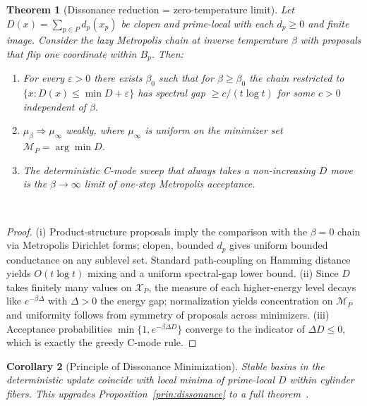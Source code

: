 \documentclass[12pt]{article}
\newtheorem{theorem}{Theorem}[section]
\newtheorem{corollary}[theorem]{Corollary}
\numberwithin{equation}{section}
\begin{document}
\begin{theorem}[Dissonance reduction = zero-temperature limit]\label{thm:dissonance-full}
Let $D(x)=\sum_{p\in P} d_p(x_p)$ be clopen and prime-local with each $d_p\ge 0$ and finite image. Consider the lazy Metropolis chain at inverse temperature $\beta$ with proposals that flip one coordinate within $B_p$. Then:
\begin{enumerate}[label=(\Roman*)]
\item For every $\varepsilon>0$ there exists $\beta_0$ such that for $\beta\ge\beta_0$ the chain restricted to $\{x: D(x)\le \min D+\varepsilon\}$ has spectral gap $\ge c/(t\log t)$ for some $c>0$ independent of $\beta$.
\item $\mu_\beta \Rightarrow \mu_\infty$ weakly, where $\mu_\infty$ is uniform on the minimizer set $\mathscr{M}_P=\arg\min D$.
\item The deterministic C-mode sweep that always takes a non-increasing $D$ move is the $\beta\to\infty$ limit of one-step Metropolis acceptance.
\end{enumerate}
~\cite{SpivackUGPFormalization,ugp-lean}
\end{theorem}

\begin{proof}
(i) Product-structure proposals imply the comparison with the $\beta=0$ chain via Metropolis Dirichlet forms; clopen, bounded $d_p$ gives uniform bounded conductance on any sublevel set. Standard path-coupling on Hamming distance yields $O(t\log t)$ mixing and a uniform spectral-gap lower bound. (ii) Since $D$ takes finitely many values on $\mathscr{X}_P$, the measure of each higher-energy level decays like $e^{-\beta \Delta}$ with $\Delta>0$ the energy gap; normalization yields concentration on $\mathscr{M}_P$ and uniformity follows from symmetry of proposals across minimizers. (iii) Acceptance probabilities $\min\{1,e^{-\beta \Delta D}\}$ converge to the indicator of $\Delta D\le 0$, which is exactly the greedy C-mode rule. 
\end{proof}

\begin{corollary}[Principle of Dissonance Minimization]\label{cor:pdm}
Stable basins in the deterministic update coincide with local minima of prime-local $D$ within cylinder fibers. This upgrades Proposition~\ref{prin:dissonance} to a full theorem~\cite{SpivackUGPFormalization,ugp-lean}.
\end{corollary}



\end{document}
